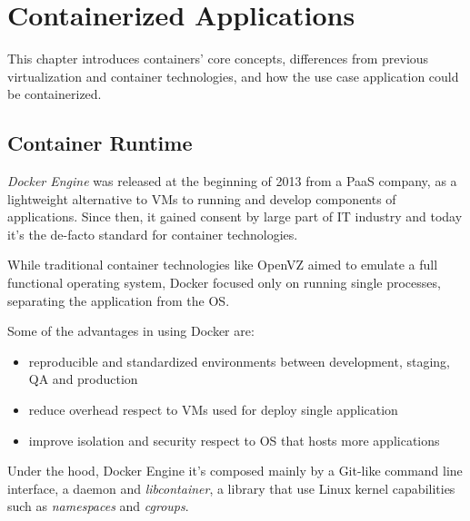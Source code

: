 \chapter{Containerized Applications}\label{containerized-applications}

This chapter introduces containers' core concepts, differences from
previous virtualization and container technologies, and how the use case
application could be containerized.

\section{Container Runtime}\label{container-runtime}

\textit{Docker Engine} was released at the beginning of 2013 from a PaaS
company, as a lightweight alternative to VMs to running and develop
components of applications. Since then, it gained consent by large part
of IT industry and today it's the de-facto standard for container
technologies.

While traditional container technologies like OpenVZ aimed to emulate a
full functional operating system, Docker focused only on running single
processes, separating the application from the OS.

Some of the advantages in using Docker are:

\begin{itemize}

\item
  reproducible and standardized environments between development,
  staging, QA and production
\item
  reduce overhead respect to VMs used for deploy single application
\item
  improve isolation and security respect to OS that hosts more
  applications
\end{itemize}

Under the hood, Docker Engine it's composed mainly by a Git-like command
line interface, a daemon and \textit{libcontainer}, a library that use
Linux kernel capabilities such as \textit{namespaces} and \textit{cgroups}.

